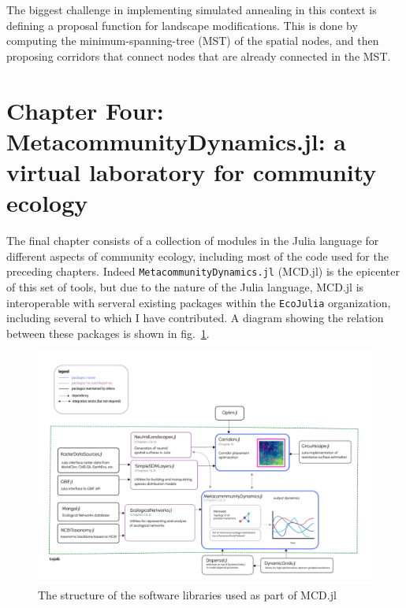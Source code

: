 \documentclass[10pt,oneside]{article}
\makeatletter
\def\maxwidth{\ifdim\Gin@nat@width>\linewidth\linewidth
\else\Gin@nat@width\fi}
\let\Oldincludegraphics\includegraphics
\renewcommand{\includegraphics}[1]{\Oldincludegraphics[width=\maxwidth]{#1}}
\makeatother
\begin{document}
The biggest challenge in implementing simulated annealing in this
context is defining a proposal function for landscape modifications.
This is done by computing the minimum-spanning-tree (MST) of the spatial
nodes, and then proposing corridors that connect nodes that are already
connected in the MST.

\hypertarget{chapter-four-metacommunitydynamics.jl-a-virtual-laboratory-for-community-ecology}{%
\section{Chapter Four: MetacommunityDynamics.jl: a virtual laboratory
for community
ecology}\label{chapter-four-metacommunitydynamics.jl-a-virtual-laboratory-for-community-ecology}}

The final chapter consists of a collection of modules in the Julia
language for different aspects of community ecology, including most of
the code used for the preceding chapters. Indeed
\texttt{MetacommunityDynamics.jl} (MCD.jl) is the epicenter of this set
of tools, but due to the nature of the Julia language, MCD.jl is
interoperable with serveral existing packages within the
\texttt{EcoJulia} organization, including several to which I have
contributed. A diagram showing the relation between these packages is
shown in fig.~\ref{fig:software}.

\begin{figure}
\hypertarget{fig:software}{%
\centering
\includegraphics{./figures/ch4.png}
\caption{The structure of the software libraries used as part of
MCD.jl}\label{fig:software}
}
\end{figure}
\end{document}

